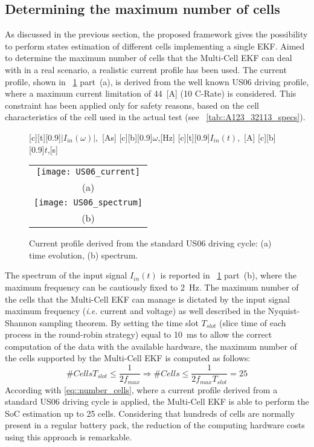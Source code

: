 \documentclass[journal]{IEEEtran}
\begin{document}
\subsection{Determining the maximum number of cells}
\label{sec::maximum_number}  
As discussed in the previous section, the proposed framework gives the possibility to perform states estimation of different cells implementing a single EKF. 
Aimed to determine the maximum number of cells that the Multi-Cell EKF can deal with in a real scenario, a realistic current profile has been used.
The current profile, shown in \figurename~\ref{fig::US06_current} part~(a), is derived from the well known US06 driving profile, where a maximum current limitation of 44~[A] (10 C-Rate) is considered. This constraint has been applied only for safety reasons, based on the cell characteristics of the cell used in the actual test (see \tablename~\ref{tab::A123_32113_specs}).
\begin{figure}[!htbp]
	\centering
	[t][0.9]{\scriptsize{$|I_{in}(\omega)|$,~[As]}}
	[b][0.9]{\scriptsize{$\omega$,[Hz]}}
	[t][0.9]{\scriptsize{$I_{in}(t)$,~[A]}}
    [c][b][0.9]{\scriptsize{$t$,[s]}}
	\begin{tabular}{c}
	   \texttt{[image: US06\_current]}\\
	   (a)\\
	   \texttt{[image: US06\_spectrum]}\\
	   (b)\\
	\end{tabular}
	\caption{Current profile derived from the standard US06 driving cycle: (a) time evolution, (b) spectrum.}
	\label{fig::US06_current}
\end{figure}
The spectrum of the input signal $I_{in}(t)$ is reported in \figurename~\ref{fig::US06_current} part~(b), where the maximum frequency can be cautiously fixed to 2~Hz.
The maximum number of the cells that the Multi-Cell EKF can manage is dictated by the input signal maximum frequency (\textit{i.e.} current and voltage) as well described in the Nyquist-Shannon sampling theorem.
By setting the time slot $T_{slot}$ (slice time of each process in the round-robin strategy) equal to 10~ms to allow the correct computation of the data with the available hardware, the maximum number of the cells supported by the Multi-Cell EKF is computed as follows:
\begin{equation}
\#Cells T_{slot} \leq \frac{1}{2 f_{max}} \Rightarrow \#Cells  \leq \frac{1}{2 f_{max}T_{slot}}= 25
\label{eq::number_cells}
\end{equation}
According with \eqref{eq::number_cells}, where a current profile derived from a standard US06 driving cycle is applied, the Multi-Cell EKF is able to perform the SoC estimation up to 25 cells. 
Considering that hundreds of cells are normally present in a regular battery pack, the reduction of the computing hardware costs using this approach is remarkable.
\end{document}
